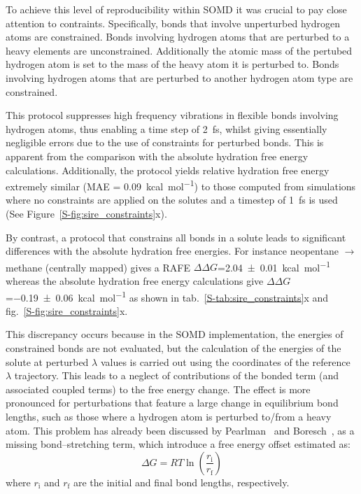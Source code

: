 \documentclass[journal=jctcce,manuscript=article]{achemso}
\begin{document}
To achieve this level of reproducibility within SOMD it was crucial to pay close
attention to contraints. Specifically, bonds that involve unperturbed 
hydrogen atoms are constrained. Bonds involving hydrogen atoms that are 
perturbed to a heavy elements are unconstrained.  Additionally the atomic mass 
of the pertubed hydrogen atom is set to the mass of the heavy atom it is 
perturbed to.  Bonds involving hydrogen atoms that are perturbed to another 
hydrogen atom type are constrained. 

This protocol suppresses high frequency vibrations in flexible bonds involving 
hydrogen atoms, thus enabling a time 
step of \SI{2}{fs}, whilst giving essentially negligible errors due to the use 
of constraints for perturbed bonds.  This is apparent from the comparison with 
the absolute hydration free energy calculations.  Additionally, the protocol 
yields relative hydration free energy extremely similar  (MAE = 
\SI{0.09}{kcal.mol^{-1}}) to those computed from simulations where no
constraints are applied on the solutes and a timestep of \SI{1}{fs} is
used (See Figure~\ref{S-fig:sire_constraints}x).

By contrast, a protocol that constrains all bonds in a solute leads to 
significant differences with the absolute hydration free energies. For instance 
neopentane $\rightarrow$ methane (centrally mapped) gives a RAFE
$\Delta\Delta G$=\SI{2.04 +- 0.01}{kcal.mol^{-1}}  whereas the absolute 
hydration free energy calculations give $\Delta\Delta 
G$=\SI{-0.19+-0.06}{kcal.mol^{-1}} as shown in 
tab.~\ref{S-tab:sire_constraints}x and fig.~\ref{S-fig:sire_constraints}x.

This discrepancy occurs because in the SOMD implementation, the energies of 
constrained bonds are not evaluated, but the calculation of the energies of the 
solute at perturbed $\lambda$ values is carried out using the coordinates of 
the reference $\lambda$ trajectory. This leads to a neglect of contributions of 
the bonded term (and associated coupled terms) to the free energy change. The 
effect is more pronounced for perturbations that feature a large change in 
equilibrium bond lengths, such as those where a hydrogen atom is perturbed 
to/from a heavy atom. This problem has already been discussed by Pearlman~\cite{pearlman1991overlooked} and Boresch~\cite{doi:10.1021/jp981628n, doi:10.1021/jp981629f}, as a missing bond--stretching term, which introduce a free energy offset estimated as:
\begin{equation}
 \label{eq:allbondserror}
 \Delta G= RT\ln \left ( \frac{r_{\mathrm{i}}}{r_\mathrm{f}} \right)
\end{equation}
where $r_{\mathrm{i}}$ and $r_{\mathrm{f}}$ are the initial and final bond 
lengths, respectively. 
\end{document}

